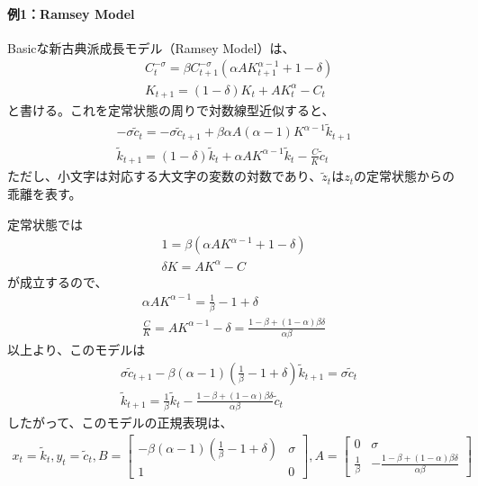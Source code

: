 \documentclass[a4j, dvipdfmx]{jarticle}
\begin{document}
\paragraph{例1：Ramsey Model}
Basicな新古典派成長モデル（Ramsey Model）は、
\begin{align}
&C_t^{-\sigma} = \beta C_{t+1}^{-\sigma} (\alpha A K_{t+1}^{\alpha-1} + 1 -\delta)\\
&K_{t+1} = (1-\delta) K_t + A K_t^\alpha - C_t
\end{align}
と書ける。これを定常状態の周りで対数線型近似すると、
\begin{align}
-\sigma \tilde c_t = -\sigma  \tilde c_{t+1} + \beta \alpha A (\alpha -1) K^{\alpha -1} \tilde k_{t+1}\\
\tilde k_{t+1} = (1-\delta) \tilde k_t + \alpha A K^{\alpha -1} \tilde k_t - \frac{C}{K} \tilde c_t
\end{align}
ただし、小文字は対応する大文字の変数の対数であり、$\tilde z_t$は$z_t$の定常状態からの乖離を表す。

定常状態では
\begin{align}
1 = \beta (\alpha A K^{\alpha -1} + 1 - \delta)\\
\delta K = AK^\alpha - C
\end{align}
が成立するので、
\begin{align}
\alpha A K^{\alpha -1} = \frac{1}{\beta} - 1 + \delta \\
\frac{C}{K} = AK^{\alpha -1} -\delta = \frac{1-\beta + (1-\alpha)\beta\delta}{\alpha\beta}
\end{align}
以上より、このモデルは
\begin{align}
&\sigma \tilde c_{t+1} - \beta (\alpha - 1) \left(\frac{1}{\beta} - 1 + \delta\right) \tilde k_{t+1} = \sigma \tilde c_t\\
&\tilde k_{t+1} = \frac{1}{\beta} \tilde k_t - \frac{1-\beta + (1-\alpha)\beta\delta}{\alpha\beta} \tilde c_t
\end{align}
したがって、このモデルの正規表現は、
\begin{align}
x_t = \tilde k_t, y_t = \tilde c_t, B = \begin{bmatrix}- \beta (\alpha - 1) \left(\frac{1}{\beta} - 1 + \delta\right) & \sigma \\ 1 & 0\end{bmatrix}, A = \begin{bmatrix} 0 & \sigma \\ \frac{1}{\beta} & - \frac{1-\beta + (1-\alpha)\beta\delta}{\alpha\beta}\end{bmatrix}
\end{align}
\end{document}
